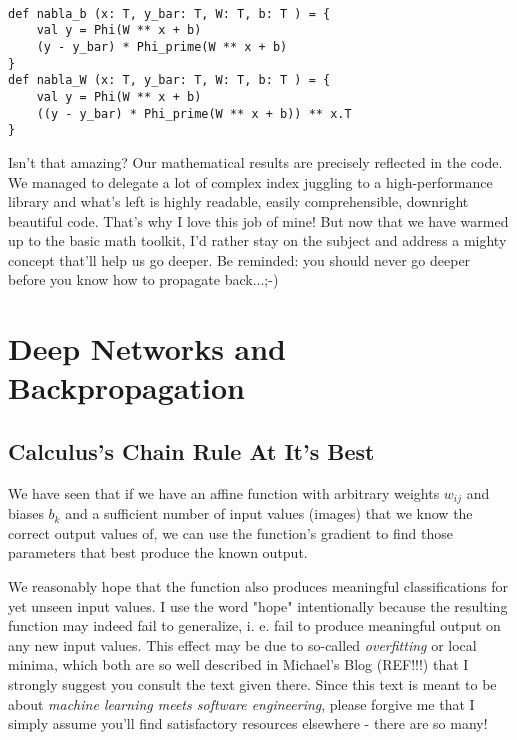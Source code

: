 \documentclass[]{report}
\begin{document}
\begin{lstlisting}[label=vectors_in_scala,caption=Transfering vector notation into code]

def nabla_b (x: T, y_bar: T, W: T, b: T ) = {
	val y = Phi(W ** x + b)
	(y - y_bar) * Phi_prime(W ** x + b)
}
def nabla_W (x: T, y_bar: T, W: T, b: T ) = {
	val y = Phi(W ** x + b)
	((y - y_bar) * Phi_prime(W ** x + b)) ** x.T
}

\end{lstlisting}

Isn't that amazing? Our mathematical results are precisely reflected in the code. We managed to delegate a lot of complex index juggling to a high-performance library and what's left is highly readable, easily comprehensible, downright beautiful code. That's why I love this job of mine!
But now that we have warmed up to the basic math toolkit, I'd rather stay on the subject and address a mighty concept that'll help us go deeper. Be reminded: you should never go deeper before you know how to propagate back...;-)

\chapter{Deep Networks and Backpropagation}

\section{Calculus's Chain Rule At It's Best}

We have seen that if we have an affine function with arbitrary weights \(w_{ij} \) and biases \(b_k \) and a sufficient number of input values (images) that we know the correct output values of, we can use the function's gradient to find those parameters that best produce the known output. 

We reasonably hope that the function also produces meaningful classifications for yet unseen input values. I use the word "hope" intentionally because the resulting function may indeed fail to generalize, i. e. fail to produce meaningful output on any new input values. This effect may be due to so-called \emph{overfitting} or local minima, which both are so well described in Michael's Blog (REF!!!) that I strongly suggest you consult the text given there. Since this text is meant to be about \emph{machine learning meets software engineering}, please forgive me that I simply assume you'll find satisfactory resources elsewhere - there are so many!
\end{document}
